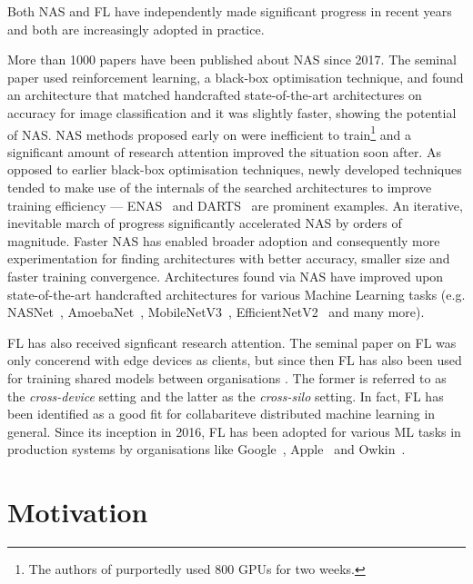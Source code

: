 Both NAS and FL have independently made significant progress in recent years and both are increasingly adopted in practice.

More than 1000 papers have been published about NAS since 2017. The seminal paper \cite{nas_with_rl_2017} used reinforcement learning, a black-box optimisation technique, and found an architecture that matched handcrafted state-of-the-art architectures on accuracy for image classification and it was slightly faster, showing the potential of NAS. NAS methods proposed early on were inefficient to train\footnote{The authors of \cite{nas_with_rl_2017} purportedly used 800 GPUs for two weeks.} and a significant amount of research attention improved the situation soon after. As opposed to earlier black-box optimisation techniques, newly developed techniques tended to make use of the internals of the searched architectures to improve training efficiency — ENAS~\cite{enas_2018} and DARTS~\cite{darts_2019} are prominent examples. An iterative, inevitable march of progress significantly accelerated NAS by orders of magnitude. Faster NAS has enabled broader adoption and consequently more experimentation for finding architectures with better accuracy, smaller size and faster training convergence. Architectures found via NAS have improved upon state-of-the-art handcrafted architectures for various Machine Learning tasks (e.g. NASNet~\cite{nasnet_2018}, AmoebaNet~\cite{amoebanet_2019}, MobileNetV3~\cite{mobilenetv3_2019}, EfficientNetV2~\cite{efficientnetv2_2021} and many more).

FL has also received signficant research attention. The seminal paper on FL \cite{fl_seminal_2017} was only concerend with edge devices as clients, but since then FL has also been used for training shared models between organisations \cite{fl_multi-institutional_2020} \cite{fl_covid-19_2021} \cite{cross-silo_vertical_horizontal_fl_2022}. The former is referred to as the \textit{cross-device} setting and the latter as the \textit{cross-silo} setting. In fact, FL has been identified as a good fit for collabariteve distributed machine learning \cite{cdml_2024} in general. Since its inception in 2016, FL has been adopted for various ML tasks in production systems by organisations like Google~\cite{gboard_fl_2018}, Apple~\cite{apple_fl_case_study_2025} and Owkin~\cite{owkin_fl_drug_discovery_in_prod_2022}.

\section{Motivation}

